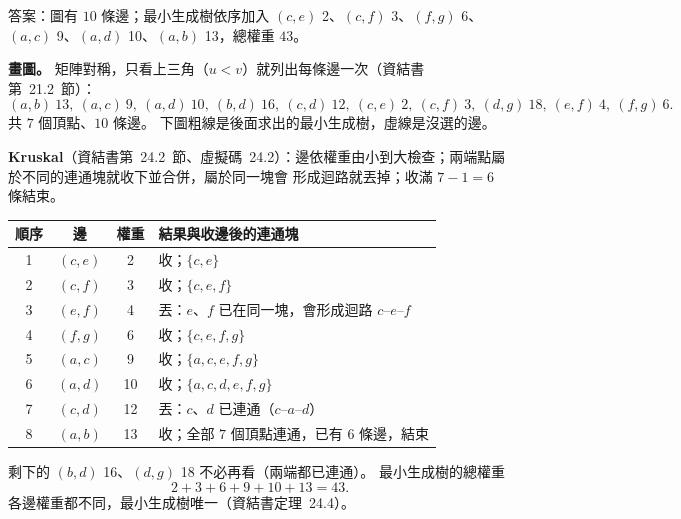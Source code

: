\begin{pastsoln}
答案：圖有 $10$ 條邊；最小生成樹依序加入 $(c,e)$ 2、$(c,f)$ 3、$(f,g)$ 6、$(a,c)$ 9、$(a,d)$ 10、$(a,b)$ 13，總權重 $43$。

\textbf{畫圖。} 矩陣對稱，只看上三角（$u < v$）就列出每條邊一次（資結書第~21.2~節）：
\[
(a,b)\ 13,\ (a,c)\ 9,\ (a,d)\ 10,\ (b,d)\ 16,\ (c,d)\ 12,\ (c,e)\ 2,\ (c,f)\ 3,\ (d,g)\ 18,\ (e,f)\ 4,\ (f,g)\ 6.
\]
共 $7$ 個頂點、$10$ 條邊。 下圖粗線是後面求出的最小生成樹，虛線是沒選的邊。
\begin{center}
\end{center}

\textbf{Kruskal}（資結書第~24.2~節、虛擬碼~24.2）：邊依權重由小到大檢查；兩端點屬於不同的連通塊就收下並合併，屬於同一塊會
形成迴路就丟掉；收滿 $7 - 1 = 6$ 條結束。
\begin{center}
\begin{tabular}{cccl}
\toprule
順序 & 邊 & 權重 & 結果與收邊後的連通塊 \\
\midrule
1 & $(c,e)$ & 2 & 收；$\{c,e\}$ \\
2 & $(c,f)$ & 3 & 收；$\{c,e,f\}$ \\
3 & $(e,f)$ & 4 & 丟：$e$、$f$ 已在同一塊，會形成迴路 $c$--$e$--$f$ \\
4 & $(f,g)$ & 6 & 收；$\{c,e,f,g\}$ \\
5 & $(a,c)$ & 9 & 收；$\{a,c,e,f,g\}$ \\
6 & $(a,d)$ & 10 & 收；$\{a,c,d,e,f,g\}$ \\
7 & $(c,d)$ & 12 & 丟：$c$、$d$ 已連通（$c$--$a$--$d$） \\
8 & $(a,b)$ & 13 & 收；全部 $7$ 個頂點連通，已有 $6$ 條邊，結束 \\
\bottomrule
\end{tabular}
\end{center}
剩下的 $(b,d)$ 16、$(d,g)$ 18 不必再看（兩端都已連通）。 最小生成樹的總權重
\[
2 + 3 + 6 + 9 + 10 + 13 = 43.
\]
各邊權重都不同，最小生成樹唯一（資結書定理~24.4）。
\end{pastsoln}
